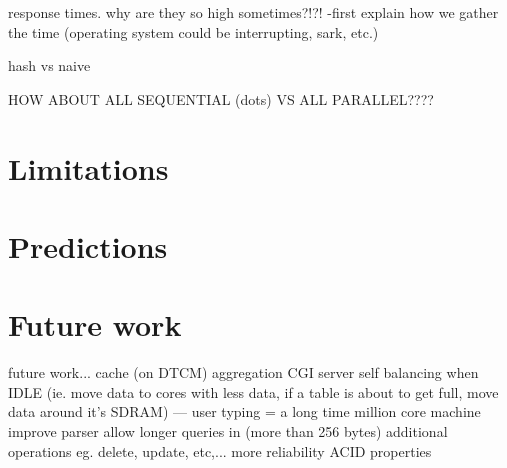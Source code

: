 response times. why are they so high sometimes?!?!
-first explain how we gather the time (operating system could be interrupting, sark, etc.)


hash vs naive


HOW ABOUT ALL SEQUENTIAL (dots) VS ALL PARALLEL????



\section{Limitations}

\section{Predictions}

\section{Future work}
future work...
cache (on DTCM)
aggregation
CGI server
self balancing when IDLE (ie. move data to cores with less data, if a table is about to get full, move data around it's SDRAM) --- user typing = a long time
million core machine
improve parser
allow longer queries in (more than 256 bytes)
additional operations eg. delete, update, etc,...
more reliability
ACID properties